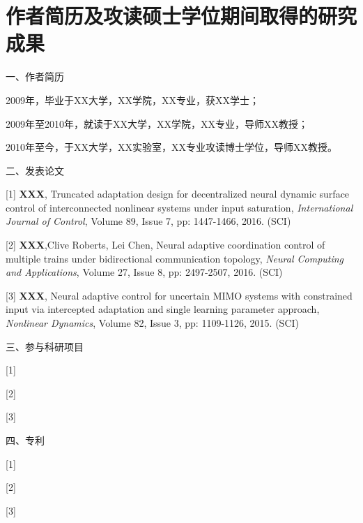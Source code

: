  \setlength{\baselineskip}{16pt}
\chapter{作者简历及攻读硕士学位期间取得的研究成果}
\setlength{\parindent}{0pt}


一、作者简历

2009年，毕业于XX大学，XX学院，XX专业，获XX学士；

2009年至2010年，就读于XX大学，XX学院，XX专业，导师XX教授；

2010年至今，于XX大学，XX实验室，XX专业攻读博士学位，导师XX教授。

\vspace{10pt}
二、发表论文

[1] \textbf{XXX}, Truncated adaptation design for decentralized neural dynamic surface control of interconnected nonlinear systems under input saturation, \emph{International Journal of Control}, Volume 89, Issue 7, pp: 1447-1466, 2016. (SCI)\vspace{-5pt}

[2] \textbf{XXX},Clive Roberts, Lei Chen, Neural adaptive coordination control of multiple trains under bidirectional communication topology, \emph{Neural Computing and Applications}, Volume 27, Issue 8, pp: 2497-2507, 2016. (SCI)

[3] \textbf{XXX}, Neural adaptive control for uncertain MIMO systems with constrained input via intercepted adaptation and single learning parameter approach, \emph{Nonlinear Dynamics}, Volume 82, Issue 3, pp: 1109-1126, 2015. (SCI)


\vspace{10pt}
三、参与科研项目

[1]

[2]

[3]

\vspace{10pt}
四、专利

[1]

[2]

[3]


%
%
%
%
%    
%


